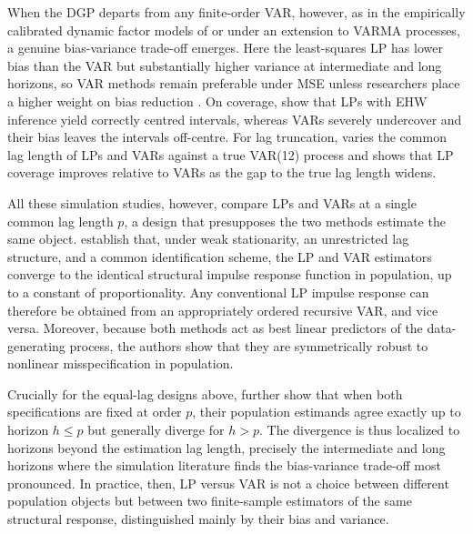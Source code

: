 When the DGP departs from any finite-order VAR, however, as in the empirically calibrated dynamic
factor models of \textcite{li2024local} or under an extension to VARMA processes, a genuine
bias-variance trade-off emerges. Here the least-squares LP has lower bias than the VAR but
substantially higher variance at intermediate and long horizons, so VAR methods remain preferable
under MSE unless researchers place a higher weight on bias reduction \parencite{li2024local}. On
coverage, \textcite{olea2024double} show that LPs with EHW inference yield correctly centred
intervals, whereas VARs severely undercover and their bias leaves the intervals off-centre. For lag
truncation, \textcite{brugnolini2018local} varies the common lag length of LPs and VARs against a
true VAR(12) process and shows that LP coverage improves relative to VARs as the gap to the true lag
length widens.

All these simulation studies, however, compare LPs and VARs at a single common lag length $p$, a
design that presupposes the two methods estimate the same object. \textcite{plagborg2021local}
establish that, under weak stationarity, an unrestricted lag structure, and a common identification
scheme, the LP and VAR estimators converge to the identical structural impulse response function in
population, up to a constant of proportionality. Any conventional LP impulse response can therefore
be obtained from an appropriately ordered recursive VAR, and vice versa. Moreover, because both
methods act as best linear predictors of the data-generating process, the authors show that they are
symmetrically robust to nonlinear misspecification in population.

Crucially for the equal-lag designs above, \textcite{plagborg2021local} further show that when both
specifications are fixed at order $p$, their population estimands agree exactly up to horizon
$h \le p$ but generally diverge for $h > p$. The divergence is thus localized to horizons beyond the
estimation lag length, precisely the intermediate and long horizons where the simulation literature
finds the bias-variance trade-off most pronounced. In practice, then, LP versus VAR is not a choice
between different population objects but between two finite-sample estimators of the same structural
response, distinguished mainly by their bias and variance.

